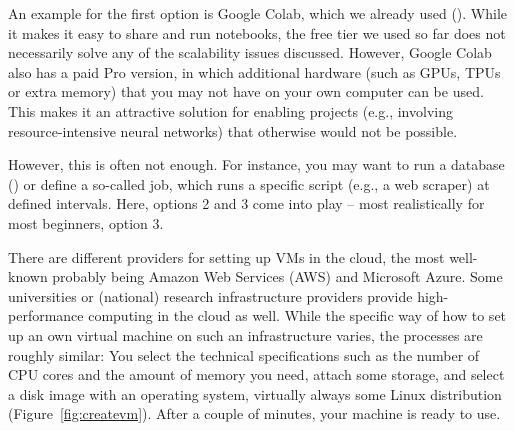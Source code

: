 An example for the first option is Google Colab, which we already used
(). While it makes it easy to share and run notebooks,
the free tier we used so far does not necessarily solve any of the
scalability issues discussed. However, Google Colab also has a paid Pro
version, in which additional hardware (such as GPUs, TPUs or extra memory)
that you may not have on your own computer can be used. This makes
it an attractive solution for enabling projects (e.g., involving
resource-intensive neural networks) that otherwise would not be possible.

However, this is often not enough. For instance, you may want to run
a database () or define a so-called  job,
which runs a specific script (e.g., a web scraper) at defined intervals.
Here, options 2 and 3 come into play -- most realistically for most
beginners, option 3.

There are different providers for setting up VMs in the cloud, the
most well-known probably being Amazon Web Services (AWS) and
Microsoft Azure. Some universities or (national) research infrastructure
providers provide high-performance computing in the cloud as well.
While the specific way of how to set up an own virtual machine on
such an infrastructure varies, the processes are roughly similar:
You select the technical specifications such as the number of CPU
cores and the amount of memory you need, attach some storage, and
select a disk image with an operating system, virtually always some
Linux distribution (Figure~\ref{fig:createvm}).
After a couple of minutes, your machine is ready to use.

